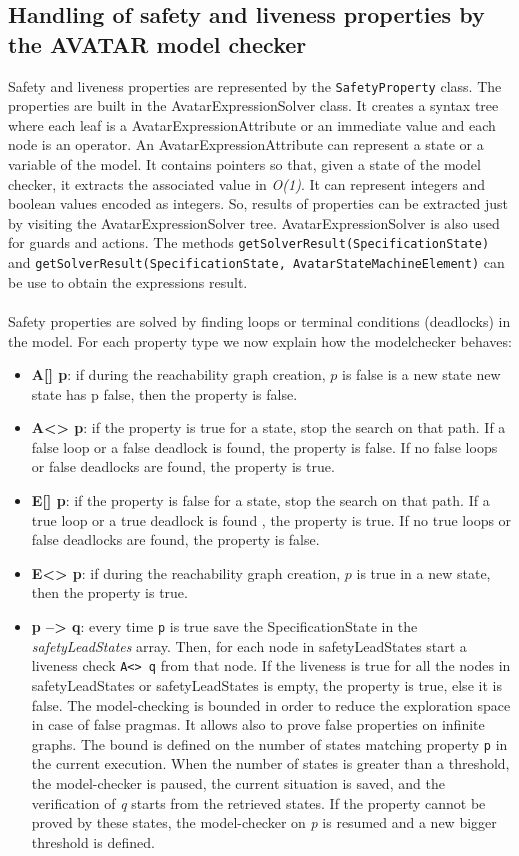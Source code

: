 \documentclass[12pt]{article}
\begin{document}
\subsection{Handling of safety and liveness properties by the AVATAR model checker}
Safety and liveness properties are represented by the \texttt{SafetyProperty} class. The properties are built in the AvatarExpressionSolver class. It creates a syntax tree where each leaf is a AvatarExpressionAttribute or an immediate value and each node is an operator. An AvatarExpressionAttribute can represent a state or a variable of the model. It contains pointers so that, given a state of the model checker, it extracts the associated value in \textit{O(1)}. It can represent integers and boolean values encoded as integers. So, results of properties can be extracted just by visiting the AvatarExpressionSolver tree. AvatarExpressionSolver is also used for guards and actions. The methods \texttt{getSolverResult(SpecificationState)} and \texttt{getSolverResult(SpecificationState, AvatarStateMachineElement)} can be use to obtain the expressions result.
\\\\
Safety properties are solved by finding loops or terminal conditions (deadlocks) in the model. For each property type we now explain how the modelchecker behaves:
\begin{itemize}
	\item \textbf{A[] p}: if during the reachability graph creation, $p$ is false is a new state new state has p false, then the property is false.
	\item \textbf{A<> p}: if the property is true for a state, stop the search on that path. If a false loop or a false deadlock is found, the property is false. If no false loops or false deadlocks are found, the property is true.
	\item \textbf{E[] p}:  if the property is false for a state, stop the search on that path. If a true loop or a true deadlock is found , the property is true. If no true loops or false deadlocks are found, the property is false.
	\item \textbf{E<> p}:  if during the reachability graph creation, $p$ is true in a new state,  then the property is true.
	\item \textbf{p --> q}: every time \texttt{p} is true save the SpecificationState in the \textit{safetyLeadStates} array. Then, for each node in safetyLeadStates start a liveness check \texttt{A<> q} from that node. If the liveness is true for all the nodes in safetyLeadStates or safetyLeadStates is empty, the property is true, else it is false. The model-checking is bounded in order to reduce the exploration space in case of false pragmas. It allows also to prove false properties on infinite graphs. The bound is defined on the number of states matching property \texttt{p} in the current execution. When the number of states is greater than a threshold, the model-checker is paused, the current situation is saved, and the verification of \textit{q} starts from the retrieved states. If the property cannot be proved by these states, the model-checker on \textit{p} is resumed and a new bigger threshold is defined.
\end{itemize}
\end{document}
